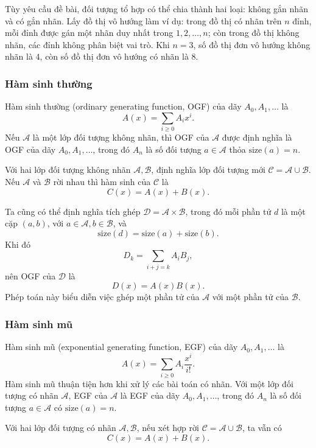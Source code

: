 \documentclass[11pt]{article}
\begin{document}
Tùy yêu cầu đề bài, đối tượng tổ hợp có thể chia thành hai loại: không gắn nhãn
và có gắn nhãn. Lấy đồ thị vô hướng làm ví dụ: trong đồ thị có nhãn trên \(n\)
đỉnh, mỗi đỉnh được gán một nhãn duy nhất trong \(1,2,\ldots,n\); còn trong đồ
thị không nhãn, các đỉnh không phân biệt vai trò. Khi \(n=3\), số đồ thị đơn vô
hướng không nhãn là \(4\), còn số đồ thị đơn vô hướng có nhãn là \(8\).

\subsubsection{Hàm sinh thường}

Hàm sinh thường (ordinary generating function, OGF) của dãy
\(A_0,A_1,\ldots\) là
\[
  A(x)=\sum_{i\ge 0} A_i x^i. \tag{3.1}
\]
Nếu \(\mathcal A\) là một lớp đối tượng không nhãn, thì OGF của \(\mathcal A\)
được định nghĩa là OGF của dãy \(A_0,A_1,\ldots\), trong đó \(A_n\) là số đối
tượng \(a\in\mathcal A\) thỏa \(\mathrm{size}(a)=n\).

Với hai lớp đối tượng không nhãn \(\mathcal A,\mathcal B\), định nghĩa lớp đối
tượng mới \(\mathcal C=\mathcal A\cup\mathcal B\). Nếu \(\mathcal A\) và
\(\mathcal B\) rời nhau thì hàm sinh của \(\mathcal C\) là
\[
  C(x)=A(x)+B(x). \tag{3.2}
\]

Ta cũng có thể định nghĩa tích ghép \(\mathcal D=\mathcal A\times\mathcal B\),
trong đó mỗi phần tử \(d\) là một cặp \((a,b)\), với
\(a\in\mathcal A,b\in\mathcal B\), và
\[
  \mathrm{size}(d)=\mathrm{size}(a)+\mathrm{size}(b).
\]
Khi đó
\[
  D_k=\sum_{i+j=k} A_iB_j, \tag{3.3}
\]
nên OGF của \(\mathcal D\) là
\[
  D(x)=A(x)B(x). \tag{3.4}
\]
Phép toán này biểu diễn việc ghép một phần tử của \(\mathcal A\) với một phần
tử của \(\mathcal B\).

\subsubsection{Hàm sinh mũ}

Hàm sinh mũ (exponential generating function, EGF) của dãy \(A_0,A_1,\ldots\)
là
\[
  A(x)=\sum_{i\ge 0} A_i\frac{x^i}{i!}. \tag{3.5}
\]
Hàm sinh mũ thuận tiện hơn khi xử lý các bài toán có nhãn. Với một lớp đối
tượng có nhãn \(\mathcal A\), EGF của \(\mathcal A\) là EGF của dãy
\(A_0,A_1,\ldots\), trong đó \(A_n\) là số đối tượng \(a\in\mathcal A\) có
\(\mathrm{size}(a)=n\).

Với hai lớp đối tượng có nhãn \(\mathcal A,\mathcal B\), nếu xét hợp rời
\(\mathcal C=\mathcal A\cup\mathcal B\), ta vẫn có
\[
  C(x)=A(x)+B(x). \tag{3.6}
\]
\end{document}
